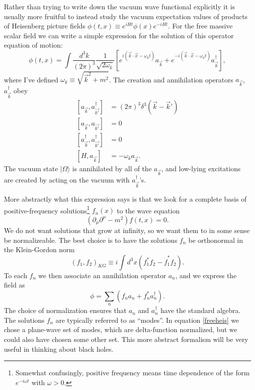 \documentclass[12pt]{article}
\newcommand{\be}{\begin{equation}}
\newcommand{\ee}{\end{equation}}
\newcommand{\ran}{\rangle}
\begin{document}
Rather than trying to write down the vacuum wave functional explicitly it is usually more fruitful to instead study the vacuum expectation values of products of Heisenberg picture fields $\phi(t,x)\equiv e^{i H t} \phi(x)e^{-iHt}$.  For the free massive scalar field we can write a simple expression for the solution of this operator equation of motion:
\be\label{freeheis}
\phi(t,x)=\int \frac{d^3 k}{(2\pi)^3}\frac{1}{\sqrt{2\omega_k}}\left[e^{i (\vec{k} \cdot \vec{x}-\omega_k t)}a_{\vec{k}}+e^{-i (\vec{k} \cdot \vec{x}-\omega_k t)}a_{\vec{k}}^\dagger\right],
\ee
where I've defined $\omega_k\equiv \sqrt{\vec{k}^2+m^2}$.  The creation and annihilation operators $a_{\vec{k}}$, $a_{\vec{k}}^\dagger$ obey
\begin{align}\nonumber
[a_{\vec{k}},a_{\vec{k'}}^\dagger]&=(2\pi)^3 \delta^3(\vec{k}-\vec{k}')\\\nonumber
[a_{\vec{k}},a_{\vec{k'}}]&=0\\\nonumber
[a_{\vec{k}}^\dagger,a_{\vec{k'}}^\dagger]&=0\\\nonumber
[H,a_{\vec{k}}]&=-\omega_k a_{\vec{k}}.
\end{align}
The vacuum state $|\Omega\ran$ is annihilated by all of the $a_{\vec{k}}$, and low-lying excitations are created by acting on the vacuum with $a_{\vec{k}}^\dagger$'s.

More abstractly what this expression says is that we look for a complete basis of positive-frequency solutions\footnote{Somewhat confusingly, positive frequency means time dependence of the form $e^{-i\omega t}$ with $\omega>0$.} $f_n(x)$ to the wave equation 
\be
\left(\partial_\mu\partial^\mu-m^2\right)f(t,x)=0.
\ee
We do not want solutions that grow at infinity, so we want them to in some sense be normalizeable.  The best choice is to have the solutions $f_n$ be orthonormal in the Klein-Gordon norm
\be\label{KGnorm}
(f_1,f_2)_{KG}\equiv i\int d^3 x \left(f_1^*\dot{f}_2-\dot{f}_1^* f_2\right). 
\ee
To each $f_n$ we then associate an annihilation operator $a_n$, and we express the field as
\be\label{field}
\phi=\sum_n\left(f_n a_n+f_n^* a_n^\dagger\right).
\ee
The choice of normalization ensures that $a_n$ and $a_n^\dagger$ have the standard algebra.  The solutions $f_n$ are typically referred to as ``modes''.  In equation \ref{freeheis} we chose a plane-wave set of modes, which are delta-function normalized, but we could also have chosen some other set.  This more abstract formalism will be very useful in thinking about black holes.  
\end{document}
